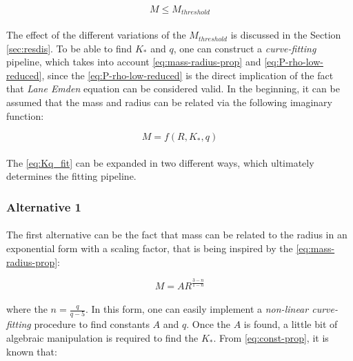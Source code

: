 \documentclass[letterpaper,12pt]{article}
\begin{document}
\begin{equation*}
    M \leqslant M_{threshold}
\end{equation*}

\paragraph{} The effect of the different variations of the $M_{threshold}$ is discussed in the Section \ref{sec:resdis}. To be able to find $K_*$ and $q$, one can construct a \textit{curve-fitting} pipeline, which takes into account \eqref{eq:mass-radius-prop} and \eqref{eq:P-rho-low-reduced}, since the \eqref{eq:P-rho-low-reduced} is the direct implication of the fact that \textit{Lane Emden} equation can be considered valid. In the beginning, it can be assumed that the mass and radius can be related via the following imaginary function:

\begin{equation}
    \label{eq:Kq_fit}
    M = f(R, K_*, q)
\end{equation}

\paragraph{} The \eqref{eq:Kq_fit} can be expanded in two different ways, which ultimately determines the fitting pipeline.

\subsubsection{Alternative 1}
\label{sec:Kq_fit_a1}

\paragraph{} The first alternative can be the fact that mass can be related to the radius in an exponential form with a scaling factor, that is being inspired by the \eqref{eq:mass-radius-prop}:

\begin{equation*}
    M = A R^{\frac{3-n}{1-n}}
\end{equation*}

\paragraph{} where the $n = \frac{q}{q-5}$. In this form, one can easily implement a \textit{non-linear curve-fitting} procedure to find constants $A$ and $q$. Once the $A$ is found, a little bit of algebraic manipulation is required to find the $K_*$. From \eqref{eq:const-prop}, it is known that:
\end{document}

